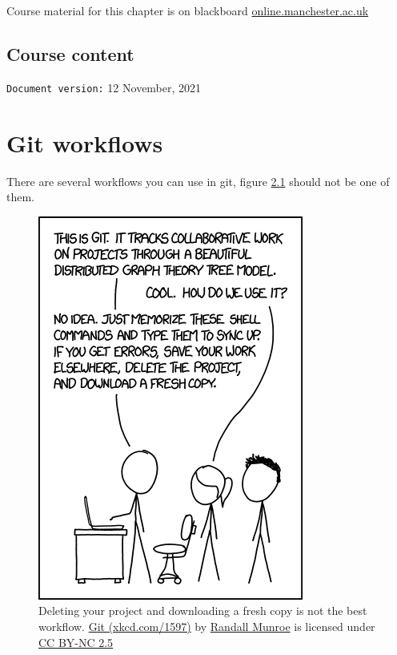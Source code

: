 \documentclass[
]{book}
\begin{document}
Course material for this chapter is on blackboard \href{https://online.manchester.ac.uk}{online.manchester.ac.uk}

\hypertarget{course-content-1}{%
\section{Course content}\label{course-content-1}}

\texttt{Document\ version:} 12 November, 2021

\hypertarget{flowing}{%
\chapter{Git workflows}\label{flowing}}

There are several workflows you can use in git, figure \ref{fig:xkcd-git-fig} should not be one of them.

\begin{figure}

{\centering \includegraphics[width=0.55\linewidth]{images/git} 

}

\caption{Deleting your project and downloading a fresh copy is not the best workflow. \href{https://xkcd.com/1597/}{Git (xkcd.com/1597)} by \href{https://en.wikipedia.org/wiki/Randall_Munroe}{Randall Munroe} is licensed under \href{https://creativecommons.org/licenses/by-nc/2.5/}{CC BY-NC 2.5}}\label{fig:xkcd-git-fig}
\end{figure}
\end{document}
